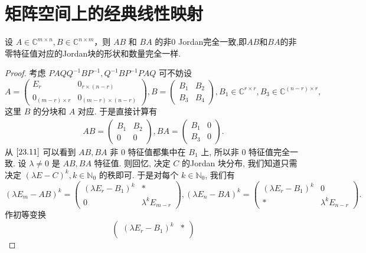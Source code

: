 \documentclass[../../main.tex]{subfiles}
\begin{document}
\section{矩阵空间上的经典线性映射}

\begin{theorem}\label{theorem:AB和BA的非0Jordan完全一致}
设 \( A \in \mathbb{C}^{m \times n}, B \in \mathbb{C}^{n \times m} \)，则 \( AB \) 和 \( BA \) 的非0 Jordan完全一致,即$AB$和$BA$的非零特征值对应的Jordan块的形状和数量完全一样.
\end{theorem}
\begin{proof}
考虑 \( PAQQ^{-1}BP^{-1}, Q^{-1}BP^{-1}PAQ \) 可不妨设
\[
A = \begin{pmatrix}
E_r & 0_{r \times (n - r)} \\
0_{(m - r) \times r} & 0_{(m - r) \times (n - r)}
\end{pmatrix}, B = \begin{pmatrix}
B_1 & B_2 \\
B_3 & B_4
\end{pmatrix}, B_1 \in \mathbb{C}^{r \times r}, B_3 \in \mathbb{C}^{(n - r) \times r},
\]
这里 \( B \) 的分块和 \( A \) 对应. 于是直接计算有
\begin{align}
AB = \begin{pmatrix}
B_1 & B_2 \\
0 & 0
\end{pmatrix}, BA = \begin{pmatrix}
B_1 & 0 \\
B_3 & 0
\end{pmatrix}. \label{23.11}
\end{align}
从 \(\eqref{23.11}\) 可以看到 \( AB, BA \) 非 0 特征值都集中在 \( B_1 \) 上, 所以非 0 特征值完全一致. 设 \( \lambda \neq 0 \) 是 \( AB, BA \) 特征值. 则回忆, 决定 \( C \) 的Jordan 块分布, 我们知道只需决定 \( (\lambda E - C)^k, k \in \mathbb{N}_0 \) 的秩即可. 于是对每个 \( k \in \mathbb{N}_0 \), 我们有
\[
(\lambda E_m - AB)^k = \begin{pmatrix}
(\lambda E_r - B_1)^k & * \\
0 & \lambda^k E_{m - r}
\end{pmatrix}, (\lambda E_n - BA)^k = \begin{pmatrix}
(\lambda E_r - B_1)^k & 0 \\
* & \lambda^k E_{n - r}
\end{pmatrix}.
\]
作初等变换
\[
\begin{pmatrix}
(\lambda E_r - B_1)^k & * \\

\end{pmatrix}\]
\end{proof}
\end{document}
